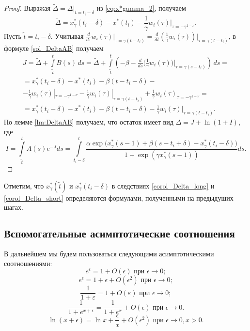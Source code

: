 %
\begin{proof}
	Выражая $\tilde{\Delta} = \Delta|_{t = t_i - \delta}$ из \eqref{eq:x*gamma_2}, получаем
\[
	\tilde{\Delta} = x^*_{\gamma}(t_i - \delta) - x^*(t_i) - \frac{1}{\gamma} w_i(\tau)|_{\tau = -\gamma^{1-\nu}}.
\]
Пусть $\tilde{t} = t_i - \delta$. Учитывая $\frac{d}{d\tau} w_i(\tau)|_{\tau = \gamma(t - t_i)} = \frac{d}{dt} \left(\frac{1}{\gamma}w_i(\tau)\right)\Big|_{\tau = \gamma(t - t_i)}$, в формуле \eqref{sol_DeltaAB} получаем
\begin{multline*}
	J = \tilde{\Delta} + \int\limits_{\tilde{t}}^{t} B(s)\,ds = \tilde{\Delta} + \int\limits_{\tilde{t}}^{t}\left(-\beta - \frac{d}{ds} \bigg(\frac{1}{\gamma}w_i(\tau)\bigg)\Big|_{\tau = \gamma(s - t_i)}\right) \,ds =\\= x^*_{\gamma}(t_i - \delta) - x^*(t_i) - \beta(t - t_i - \delta) - \\ - \frac{1}{\gamma} w_i(\tau)|_{\tau = -\gamma^{1-\nu}} - \frac{1}{\gamma}w_i(\tau)|_{\tau = \gamma(t - t_i)} + \frac{1}{\gamma}w_i(\tau)_{\tau = -\gamma^{1 - \nu}} = \\
	= x^*_{\gamma}(t_i - \delta) - x^*(t_i) - \beta(t - t_i - \delta) - \frac{1}{\gamma} w_i(\tau)|_{\tau = \gamma(t - t_i)}.
\end{multline*}
%
По лемме \ref{lm:DeltaAB} получаем, что остаток имеет вид $\Delta = J + \ln(1 + I)$, где 
\[
I = \int\limits_{\tilde{t}}^{t}A(s) e^{-J} ds = \int\limits_{t_i-\delta}^{t}\frac{\alpha\exp\big(x_{\gamma}^*(s-1)+\beta(s-t_i+\delta)-x_{\gamma}^*(t_i-\delta)\big)}{1+\exp(\gamma x_{\gamma}^*(s-1))}ds.
\]
\end{proof}
%
Отметим, что $x_{\gamma}^*(\tilde{t})$ и $x_{\gamma}^*(t_i-\delta)$ в следствиях \ref{corol_Delta_long} и \ref{corol_Delta_short} определяются формулами, полученными на предыдущих шагах.

\subsection{Вспомогательные асимптотические соотношения}

В дальнейшем мы будем пользоваться следующими асимптотическими соотношениями:
\begin{equation}
\label{eq:exp_const}
	e^{\epsilon} = 1 + O(\epsilon) \text{ при } \epsilon \to 0;
\end{equation}
\begin{equation}
\label{eq:exp_linear}
	e^{\epsilon} = 1 + \epsilon + O(\epsilon^2) \text{ при } \epsilon \to 0;
\end{equation}
\begin{equation}
\label{eq:asymp_frac}
	\frac{1}{1 + \varepsilon} = 1 + O(\varepsilon) \text{ при } \epsilon \to 0;
\end{equation}
\begin{equation}
\label{eq:exp_frac}
	\dfrac{1}{1 + e^{x + \epsilon}} = \frac{1}{1 + e^x} + O(\epsilon) \text{ при } \epsilon \to 0.
\end{equation}
\begin{equation}
\label{eq:ln_frac}
\ln(x + \epsilon) = \ln x + \frac{\epsilon}{x} + O(\epsilon^2) \text{ при } \epsilon \to 0, x > 0.
\end{equation}

